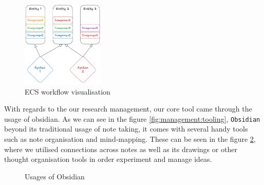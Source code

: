 \begin{figure}[h!]
    \centering
    \includegraphics[width=0.35\textwidth]{assets/ECS-visualisatoin.png}
    \caption{ECS workflow visualisation}
    \label{fig:soft:ecs-workflow}
\end{figure}

With regards to the our research management, our core tool came
through the usage of obsidian. As we can see in the figure \ref{fig:management:tooling}, 
\texttt{Obsidian} beyond its traditional usage of note taking, it comes
with several handy tools such as note organisation and mind-mapping.
These can be seen in the figure \ref{fig:theory:obsidian-usages}, where we utilised connections across notes as well as
its drawings or other thought organisation tools in order
experiment and manage ideas.



\begin{figure}[h!]
    \centering
    \caption{Usages of Obsidian}
    \label{fig:theory:obsidian-usages}
\end{figure}



